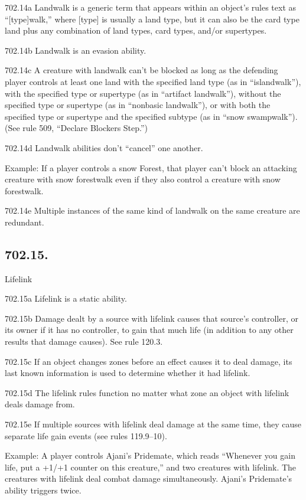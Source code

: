 702.14a Landwalk is a generic term that appears within an object’s rules text as “[type]walk,” where [type] is usually a land type, but it can also be the card type land plus any combination of land types, card types, and/or supertypes.

702.14b Landwalk is an evasion ability.

702.14c A creature with landwalk can’t be blocked as long as the defending player controls at least one land with the specified land type (as in “islandwalk”), with the specified type or supertype (as in “artifact landwalk”), without the specified type or supertype (as in “nonbasic landwalk”), or with both the specified type or supertype and the specified subtype (as in “snow swampwalk”). (See rule 509, “Declare Blockers Step.”)

702.14d Landwalk abilities don’t “cancel” one another.

Example: If a player controls a snow Forest, that player can’t block an attacking creature with snow forestwalk even if they also control a creature with snow forestwalk.

702.14e Multiple instances of the same kind of landwalk on the same creature are redundant.

\subsection*{702.15.}
Lifelink

702.15a Lifelink is a static ability.

702.15b Damage dealt by a source with lifelink causes that source’s controller, or its owner if it has no controller, to gain that much life (in addition to any other results that damage causes). See rule 120.3.

702.15c If an object changes zones before an effect causes it to deal damage, its last known information is used to determine whether it had lifelink.

702.15d The lifelink rules function no matter what zone an object with lifelink deals damage from.

702.15e If multiple sources with lifelink deal damage at the same time, they cause separate life gain events (see rules 119.9–10).

Example: A player controls Ajani’s Pridemate, which reads “Whenever you gain life, put a +1/+1 counter on this creature,” and two creatures with lifelink. The creatures with lifelink deal combat damage simultaneously. Ajani’s Pridemate’s ability triggers twice.

